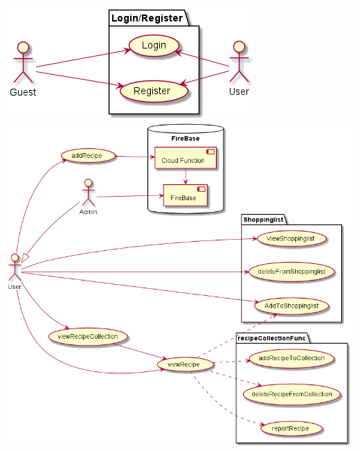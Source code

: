 \documentclass[12pt]{report}
\theoremstyle{definition}
\begin{document}
\noindent
\includegraphics[scale=0.6]{out/diagrams/useCaseGuest/useCaseGuest.png} \\
\noindent
\includegraphics[scale=0.5]{out/diagrams/useCaseUser/useCaseUser.png}
\end{document}
